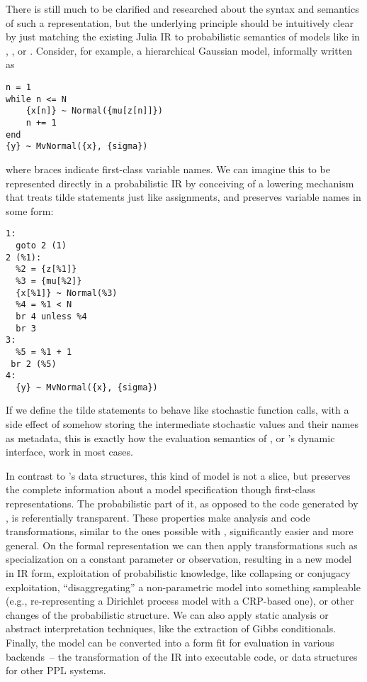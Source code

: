 There is still much to be clarified and researched about the syntax and semantics of such a
representation, but the underlying principle should be intuitively clear by just matching the
existing Julia IR to probabilistic semantics of models like in \turingjl{}, ,
or .  Consider, for example, a hierarchical Gaussian model, informally written
as
\begin{lstlisting}
n = 1
while n <= N
    {x[n]} ~ Normal({mu[z[n]]})
    n += 1
end
{y} ~ MvNormal({x}, {sigma})
\end{lstlisting}
where braces indicate first-class variable names.  We can imagine this to be represented directly in
a probabilistic IR by conceiving of a lowering mechanism that treats tilde statements just like
assignments, and preserves variable names in some form:
\begin{lstlisting}
1:
  goto 2 (1)
2 (%1):
  %2 = {z[%1]}
  %3 = {mu[%2]}
  {x[%1]} ~ Normal(%3)
  %4 = %1 < N
  br 4 unless %4
  br 3
3:
  %5 = %1 + 1
 br 2 (%5)
4:
  {y} ~ MvNormal({x}, {sigma})
\end{lstlisting}
If we define the tilde statements to behave like stochastic function calls, with a side effect of
somehow storing the intermediate stochastic values and their names as metadata, this is exactly how
the evaluation semantics of \dppljl{}, or 's dynamic interface, work in most
cases.

In contrast to \autogibbsjl{}'s data structures, this kind of model is not a slice, but preserves
the complete information about a model specification though first-class representations.  The
probabilistic part of it, as opposed to the code generated by \dppljl{}, is referentially
transparent.  These properties make analysis and code transformations, similar to the ones possible
with , significantly easier and more general.  On the formal representation
we can then apply transformations such as specialization on a constant parameter or observation,
resulting in a new model in IR form, exploitation of probabilistic knowledge, like collapsing or
conjugacy exploitation, \enquote{disaggregating} a non-parametric model into something sampleable
(e.g., re-representing a Dirichlet process model with a CRP-based one), or other changes of the
probabilistic structure.  We can also apply static analysis or abstract interpretation techniques,
like the extraction of Gibbs conditionals.  Finally, the model can be converted into a form fit for
evaluation in various backends~-- the transformation of the IR into executable code, or data
structures for other PPL systems.

